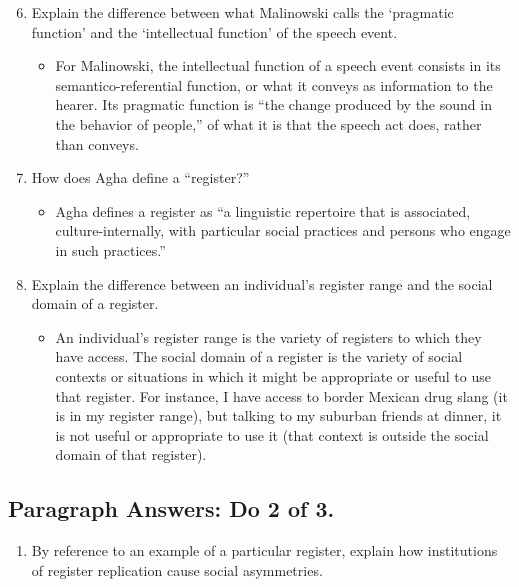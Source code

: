 \documentclass[man,12pt]{apa6}
\providecommand{\tightlist}{%
  \setlength{\itemsep}{0pt}\setlength{\parskip}{0pt}}
\begin{document}
\begin{enumerate}
\setcounter{enumi}{5}
\item
  Explain the difference between what Malinowski calls the `pragmatic
  function' and the `intellectual function' of the speech event.

  \begin{itemize}
  \tightlist
  \item
    For Malinowski, the intellectual function of a speech event consists
    in its semantico-referential function, or what it conveys as
    information to the hearer. Its pragmatic function is ``the change
    produced by the sound in the behavior of people,'' of what it is
    that the speech act does, rather than conveys.
  \end{itemize}
\item
  How does Agha define a ``register?''

  \begin{itemize}
  \tightlist
  \item
    Agha defines a register as ``a linguistic repertoire that is
    associated, culture-internally, with particular social practices and
    persons who engage in such practices.''
  \end{itemize}
\item
  Explain the difference between an individual's register range and the
  social domain of a register.

  \begin{itemize}
  \tightlist
  \item
    An individual's register range is the variety of registers to which
    they have access. The social domain of a register is the variety of
    social contexts or situations in which it might be appropriate or
    useful to use that register. For instance, I have access to border
    Mexican drug slang (it is in my register range), but talking to my
    suburban friends at dinner, it is not useful or appropriate to use
    it (that context is outside the social domain of that register).
  \end{itemize}
\end{enumerate}

\subsection{Paragraph Answers: Do 2 of
3.}\label{paragraph-answers-do-2-of-3.}

\begin{enumerate}
\def\labelenumi{\arabic{enumi}.}
\setcounter{enumi}{9}
\tightlist
\item
  By reference to an example of a particular register, explain how
  institutions of register replication cause social asymmetries.
\end{enumerate}
\end{document}
